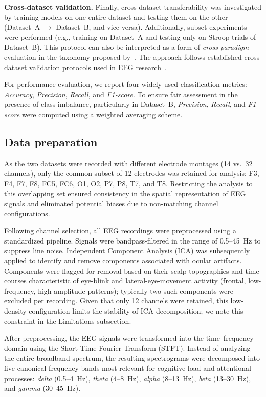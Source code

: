 \documentclass[10pt,letterpaper]{article}
\newcommand{\rev}[1]{\par\noindent\colorbox{yellow}{\parbox{\dimexpr\linewidth-2\fboxsep\relax}{#1}}\par}
\renewcommand{\rev}[1]{#1}
\begin{document}
\textbf{Cross-dataset validation.}
Finally, cross-dataset transferability was investigated by training models on one entire dataset and testing them on the other (Dataset~A $\rightarrow$ Dataset~B, and vice versa). Additionally, subset experiments were performed (e.g., training on Dataset~A and testing only on Stroop trials of Dataset~B). This protocol can also be interpreted as a form of \textit{cross-paradigm} evaluation in the taxonomy proposed by~\cite{chen2025hybrid}. The approach follows established cross-dataset validation protocols used in EEG research~\cite{li2020domain,nguyen2022kalman}.

For performance evaluation, we report four widely used classification metrics: \textit{Accuracy}, \textit{Precision}, \textit{Recall}, and \textit{F1-score}. To ensure fair assessment in the presence of class imbalance, particularly in Dataset~B, \textit{Precision}, \textit{Recall}, and \textit{F1-score} were computed using a weighted averaging scheme.

\subsection*{Data preparation}

As the two datasets were recorded with different electrode montages (14 vs.\ 32 channels), only the common subset of 12 electrodes was retained for analysis: F3, F4, F7, F8, FC5, FC6, O1, O2, P7, P8, T7, and T8. Restricting the analysis to this overlapping set ensured consistency in the spatial representation of EEG signals and eliminated potential biases due to non-matching channel configurations.

Following channel selection, all EEG recordings were preprocessed using a standardized pipeline. Signals were bandpass-filtered in the range of 0.5--45~Hz to suppress line noise. Independent Component Analysis (ICA) was subsequently applied to identify and remove components associated with ocular artifacts. \rev{Components were flagged for removal based on their scalp topographies and time courses characteristic of eye-blink and lateral-eye-movement activity (frontal, low-frequency, high-amplitude patterns); typically two such components were excluded per recording.} \rev{Given that only 12 channels were retained, this low-density configuration limits the stability of ICA decomposition; we note this constraint in the Limitations subsection.}

After preprocessing, the EEG signals were transformed into the time--frequency domain using the Short-Time Fourier Transform (STFT). Instead of analyzing the entire broadband spectrum, the resulting spectrograms were decomposed into five canonical frequency bands most relevant for cognitive load and attentional processes: \textit{delta} (0.5--4~Hz), \textit{theta} (4--8~Hz), \textit{alpha} (8--13~Hz), \textit{beta} (13--30~Hz), and \textit{gamma} (30--45~Hz).
\end{document}
